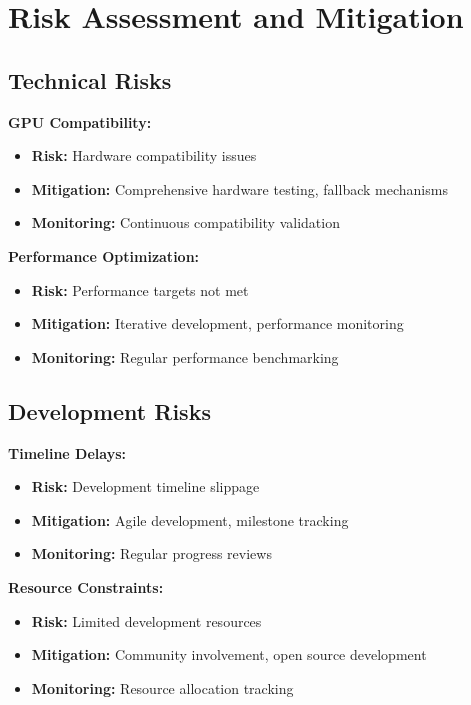 \documentclass[12pt,a4paper]{article}
\begin{document}
\section{Risk Assessment and Mitigation}

\subsection{Technical Risks}

\textbf{GPU Compatibility:}
\begin{itemize}
    \item \textbf{Risk:} Hardware compatibility issues
    \item \textbf{Mitigation:} Comprehensive hardware testing, fallback mechanisms
    \item \textbf{Monitoring:} Continuous compatibility validation
\end{itemize}

\textbf{Performance Optimization:}
\begin{itemize}
    \item \textbf{Risk:} Performance targets not met
    \item \textbf{Mitigation:} Iterative development, performance monitoring
    \item \textbf{Monitoring:} Regular performance benchmarking
\end{itemize}

\subsection{Development Risks}

\textbf{Timeline Delays:}
\begin{itemize}
    \item \textbf{Risk:} Development timeline slippage
    \item \textbf{Mitigation:} Agile development, milestone tracking
    \item \textbf{Monitoring:} Regular progress reviews
\end{itemize}

\textbf{Resource Constraints:}
\begin{itemize}
    \item \textbf{Risk:} Limited development resources
    \item \textbf{Mitigation:} Community involvement, open source development
    \item \textbf{Monitoring:} Resource allocation tracking
\end{itemize}
\end{document}
